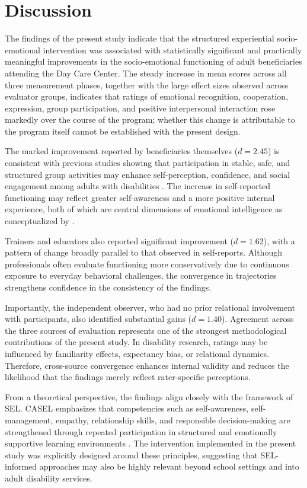 \documentclass[12pt,a4paper]{article}
\begin{document}
\section{Discussion}

The findings of the present study indicate that the structured experiential socio-emotional intervention was associated with statistically significant and practically meaningful improvements in the socio-emotional functioning of adult beneficiaries attending the Day Care Center. The steady increase in mean scores across all three measurement phases, together with the large effect sizes observed across evaluator groups, indicates that ratings of emotional recognition, cooperation, expression, group participation, and positive interpersonal interaction rose markedly over the course of the program; whether this change is attributable to the program itself cannot be established with the present design.

The marked improvement reported by beneficiaries themselves ($d = 2.45$) is consistent with previous studies showing that participation in stable, safe, and structured group activities may enhance self-perception, confidence, and social engagement among adults with disabilities \parencite{hall2009}. The increase in self-reported functioning may reflect greater self-awareness and a more positive internal experience, both of which are central dimensions of emotional intelligence as conceptualized by \textcite{goleman1995}.

Trainers and educators also reported significant improvement ($d = 1.62$), with a pattern of change broadly parallel to that observed in self-reports. Although professionals often evaluate functioning more conservatively due to continuous exposure to everyday behavioral challenges, the convergence in trajectories strengthens confidence in the consistency of the findings.

Importantly, the independent observer, who had no prior relational involvement with participants, also identified substantial gains ($d = 1.40$). Agreement across the three sources of evaluation represents one of the strongest methodological contributions of the present study. In disability research, ratings may be influenced by familiarity effects, expectancy bias, or relational dynamics. Therefore, cross-source convergence enhances internal validity and reduces the likelihood that the findings merely reflect rater-specific perceptions.

From a theoretical perspective, the findings align closely with the framework of SEL. CASEL emphasizes that competencies such as self-awareness, self-management, empathy, relationship skills, and responsible decision-making are strengthened through repeated participation in structured and emotionally supportive learning environments \parencite{casel2020,weissberg2015}. The intervention implemented in the present study was explicitly designed around these principles, suggesting that SEL-informed approaches may also be highly relevant beyond school settings and into adult disability services.
\end{document}

